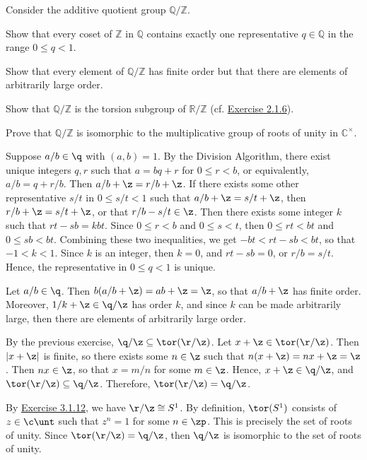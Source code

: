 \newpage

\begin{specialexercise}\label{ex3.1.14}
    Consider the additive quotient group $\mathbb{Q}/\mathbb{Z}$.
    \begin{subproblems}
        \item Show that every coset of $\mathbb{Z}$ in $\mathbb{Q}$ contains exactly one representative $q \in \mathbb{Q}$ in the range $0 \le q < 1$.
        \item Show that every element of $\mathbb{Q}/\mathbb{Z}$ has finite order but that there are elements of arbitrarily large order.
        \item Show that $\mathbb{Q}/\mathbb{Z}$ is the torsion subgroup of $\mathbb{R}/\mathbb{Z}$ (cf. \hyperref[ex2.1.6]{Exercise 2.1.6}).
        \item Prove that $\mathbb{Q}/\mathbb{Z}$ is isomorphic to the multiplicative group of roots of unity in $\mathbb{C}^\times$.
    \end{subproblems}
\end{specialexercise}

\begin{solalph}
    \item Suppose $a/b \in \q$ with $(a, b) = 1$. By the Division Algorithm, there exist unique integers $q, r$ such that $a = bq + r$ for $0 \leq r < b$, or equivalently, $a/b = q + r/b$. Then $a/b + \z = r/b + \z$. If there exists some other representative $s/t$ in $0 \leq s/t < 1$ such that $a/b + \z = s/t + \z$, then $r/b + \z = s/t + \z$, or that $r/b - s/t \in \z$. Then there exists some integer $k$ such that $rt - sb = kbt$. Since $0 \leq r < b$ and $0 \leq s < t$, then $0 \leq rt < bt$ and $0 \leq sb < bt$. Combining these two inequalities, we get $-bt < rt - sb < bt$, so that $-1 < k < 1$. Since $k$ is an integer, then $k = 0$, and $rt - sb = 0$, or $r/b = s/t$. Hence, the representative in $0 \leq q < 1$ is unique.
    \item Let $a/b \in \q$. Then $b(a/b + \z) = ab + \z = \z$, so that $a/b + \z$ has finite order. Moreover, $1/k + \z \in \q/\z$ has order $k$, and since $k$ can be made arbitrarily large, then there are elements of arbitrarily large order.
    \item By the previous exercise, $\q/\z \subseteq \tor(\r/\z)$. Let $x + \z \in \tor(\r/\z)$. Then $|x + \z|$ is finite, so there exists some $n \in \z$ such that $n(x + \z) = nx + \z = \z$. Then $nx \in \z$, so that $x = m/n$ for some $m \in \z$. Hence, $x + \z \in \q/\z$, and $\tor(\r/\z) \subseteq \q/\z$. Therefore, $\tor(\r/\z) = \q/\z$.
    \item By \hyperref[ex3.1.12]{Exercise 3.1.12}, we have $\r/\z \cong S^1$. By definition, $\tor(S^1)$ consists of $z \in \c\unt$ such that $z^n = 1$ for some $n \in \zp$. This is precisely the set of roots of unity. Since $\tor(\r/\z) = \q/\z$, then $\q/\z$ is isomorphic to the set of roots of unity.
\end{solalph}

